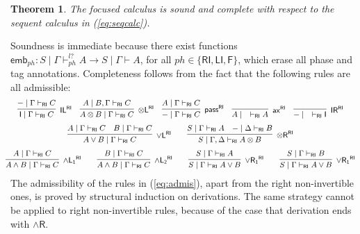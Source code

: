 \documentclass[submission,copyright,creativecommons]{eptcs}
\newtheorem{theorem}{Theorem}[section]
\theoremstyle{definition}
\newcommand{\tl}{\otimes \mathsf{L}}
\newcommand{\tr}{\otimes \mathsf{R}}
\newcommand{\pass}{\mathsf{pass}}
\newcommand{\unitl}{\mathsf{IL}}
\newcommand{\unitr}{\mathsf{IR}}
\newcommand{\andlone}{\land \mathsf{L_{1}}}
\newcommand{\andltwo}{\land \mathsf{L_{2}}}
\newcommand{\andr}{\land \mathsf{R}}
\newcommand{\orl}{\lor \mathsf{L}}
\newcommand{\orrone}{\lor \mathsf{R_{1}}}
\newcommand{\ax}{\mathsf{ax}}
\newcommand{\ot}{\otimes}
\newcommand{\I}{\mathsf{I}}
\newcommand{\RI}{\mathsf{RI}}
\newcommand{\LI}{\mathsf{LI}}
\newcommand{\F}{\mathsf{F}}
\begin{document}
\begin{theorem}\label{theorem:focus:sound:complete}
  The focused calculus is sound and complete with respect to the sequent calculus in (\ref{eq:seqcalc}).
\end{theorem}
Soundness is immediate because there exist functions $\mathsf{emb}_{ph} : S \mid \Gamma \vdash^{l?}_{ph} A \to S \mid \Gamma \vdash A$, for all $ph \in \{ \RI , \LI , \F \}$, which erase all phase and tag annotations.
Completeness follows from the fact that the following rules are all admissible:
\begin{equation}\label{eq:admis}
  \small
  \hspace*{-4mm}
    \begin{array}{c}
      \infer[\unitl^{\RI}]{\I \mid \Gamma \vdash_{\RI} C}{{-} \mid \Gamma \vdash_{\RI} C}
      \quad
      \infer[\tl^{\RI}]{A \ot B \mid \Gamma \vdash_{\RI} C}{A \mid B, \Gamma \vdash_{\RI} C}
      \quad
      \infer[\pass^{\RI}]{{-} \mid \Gamma \vdash_{\RI} C}{A \mid \Gamma \vdash_{\RI} C}
      \quad
      \infer[\ax^{\RI}]{A \mid \quad \vdash_{\RI} A}{}
      \quad
      \infer[\unitr^{\RI}]{{-} \mid \quad \vdash_{\RI} \I}{}
  \\[6pt]
      \infer[\orl^{\RI}]{A \lor B \mid \Gamma \vdash_{\RI} C}{
      A \mid \Gamma \vdash_{\RI} C
      &
      B \mid \Gamma \vdash_{\RI} C
      }
      \qquad
      \infer[\tr^{\RI}]{S \mid \Gamma , \Delta \vdash_{\RI} A \ot B}{
        S \mid \Gamma \vdash_{\RI} A
        &
        {-} \mid \Delta \vdash_{\RI} B
      }
  \\[6pt]
      \infer[\andlone^{\RI}]{A \land B \mid \Gamma \vdash_{\RI} C}{A \mid \Gamma \vdash_{\RI} C}
      \qquad
      \infer[\andltwo^{\RI}]{A \land B \mid \Gamma \vdash_{\RI} C}{B \mid \Gamma \vdash_{\RI} C}
      \qquad
      \infer[\orrone^{\RI}]{S \mid \Gamma \vdash_{\RI} A \lor B}{S \mid \Gamma \vdash_{\RI} A}
      \qquad
      \infer[\orrone^{\RI}]{S \mid \Gamma \vdash_{\RI} A \lor B}{S \mid \Gamma \vdash_{\RI} B}
    \end{array}
  \end{equation}
The admissibility of the rules in (\ref{eq:admis}), apart from the right non-invertible ones, is proved by structural induction on derivations.
The same strategy cannot be applied to right non-invertible rules, because of the case that derivation ends with $\andr$.
\end{document}
